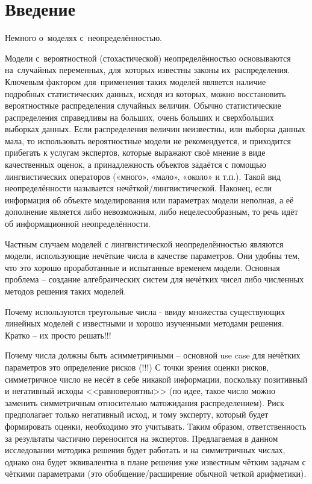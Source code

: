 \chapter*{Введение}
Немного о~моделях с~неопределённостью.

Модели с~вероятностной (стохастической) неопределённостью основываются на~случайных переменных, для~которых известны законы их~распределения. Ключевым фактором для~применения таких моделей является наличие подробных статистических данных, исходя из которых, можно восстановить вероятностные распределения случайных величин. Обычно статистические распределения справедливы на больших, очень больших и сверхбольших выборках данных. Если распределения величин неизвестны, или выборка данных мала, то использовать вероятностные модели не рекомендуется, и приходится прибегать к услугам экспертов, которые выражают своё мнение в виде качественных оценок, а принадлежность объектов задаётся с помощью лингвистических операторов («много», «мало», «около» и т.п.). Такой вид неопределённости называется нечёткой/лингвистической. Наконец, если информация об объекте моделирования или параметрах модели неполная, а её дополнение является либо невозможным, либо нецелесообразным, то речь идёт об информационной неопределённости.

Частным случаем моделей с лингвистической неопределённостью являются модели, использующие нечёткие числа в качестве параметров. Они удобны тем, что это хорошо проработанные и испытанные временем модели. Основная проблема – создание алгебраических систем для нечётких чисел либо численных методов решения таких моделей.

Почему используются треугольные числа - ввиду множества существующих линейных моделей с известными и хорошо изученными методами решения. Кратко – их просто решать!!!

Почему числа должны быть асимметричными – основной use case для нечётких параметров это определение рисков (!!!) С точки зрения оценки рисков, симметричное число не несёт в себе никакой информации, поскольку позитивный и негативный исходы <<равновероятны>> (по идее, такое число можно заменить симметричным относительно матожидания распределением). Риск предполагает только негативный исход, и тому эксперту, который будет формировать оценки, необходимо это учитывать. Таким образом, ответственность за результаты частично переносится на экспертов. Предлагаемая в данном исследовании методика решения будет работать и на симметричных числах, однако она будет эквивалентна в плане решения уже известным чётким задачам с чёткими параметрами (это обобщение/расширение обычной четкой арифметики).